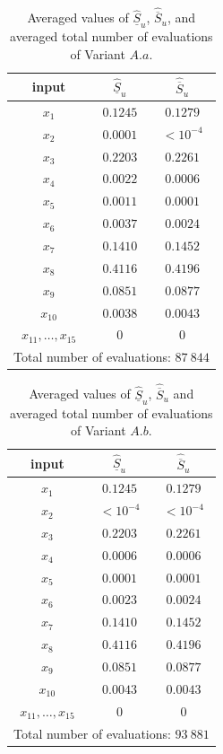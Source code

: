 {\begin{table}[t]
\caption{Averaged values of $\widehat{\underline{S}}_u$, ${\widehat{\overline{S}}_u}$, and averaged total number of evaluations of Variant $A.a$.}
\centering
\begin{tabular}{ccc}
\hline
 input & $\widehat{\underline{S}}_u$ & $\widehat{\overline{S}}_u$ \\ \hline
 $x_1$ & $0.1245$ & $0.1279$  \\ \hline
 $x_2$ & $0.0001$ & $< 10^{-4}$  \\ \hline
 $x_3$ & $0.2203$ & $0.2261$  \\ \hline
 $x_4$ & $0.0022$ & $0.0006$  \\ \hline
 $x_5$ & $0.0011$ & $0.0001$  \\ \hline
 $x_6$ & $0.0037$ & $0.0024$  \\ \hline 
 $x_7$ & $0.1410$ & $0.1452$  \\ \hline
 $x_8$ & $0.4116$ & $0.4196$  \\ \hline
 $x_9$ & $0.0851$ & $0.0877$  \\ \hline
 $x_{10}$ & $0.0038$ & $0.0043$  \\ \hline
 $x_{11},\dots,x_{15}$ & $0$ & $0$  \\ \hline
\hline
\multicolumn{3}{l}{Total number of evaluations: $87 \ 844$} \\ \hline 
\end{tabular}
\label{res.wing.Aa}
\end{table}
\begin{table}[t]
\caption{Averaged values of $\widehat{\underline{S}}_u$, ${\widehat{\overline{S}}_u}$ and averaged total number of evaluations of Variant $A.b$.}
 \centering
\begin{tabular}{ccc}
\hline
  input & $\widehat{\underline{S}}_u$ & $\widehat{\overline{S}}_u$ \\ \hline
 $x_1$ & $0.1245$ & $0.1279$  \\ \hline
 $x_2$ & $< 10^{-4}$ & $< 10^{-4}$  \\ \hline
 $x_3$ & $0.2203$ & $0.2261$  \\ \hline
 $x_4$ & $0.0006$ & $0.0006$  \\ \hline
 $x_5$ & $0.0001$ & $0.0001$  \\ \hline
 $x_6$ & $0.0023$ & $0.0024$  \\ \hline 
 $x_7$ & $0.1410$ & $0.1452$  \\ \hline
 $x_8$ & $0.4116$ & $0.4196$  \\ \hline
 $x_9$ & $0.0851$ & $0.0877$  \\ \hline
 $x_{10}$ & $0.0043$ & $0.0043$  \\ \hline
 $x_{11},\dots,x_{15}$ & $0$ & $0$  \\ \hline
\hline
\multicolumn{3}{l}{Total number of evaluations: $93 \ 881$} \\ \hline 
\end{tabular}
\label{res.wing.Ab}
\end{table}

}
